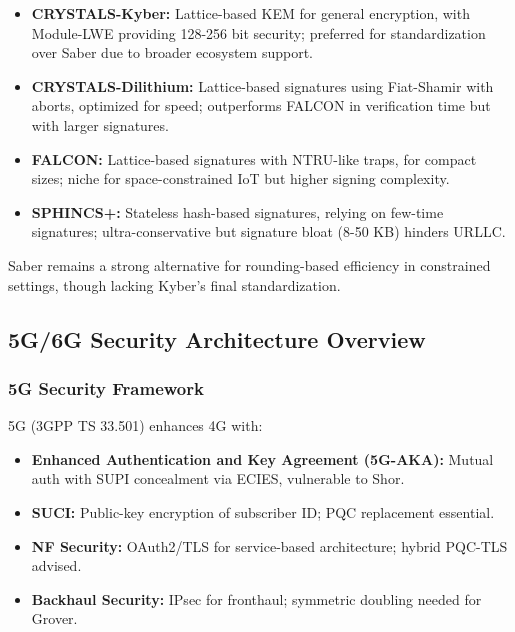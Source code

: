 \documentclass[11pt,a4paper]{article}
\begin{document}
\begin{itemize}
    \item \textbf{CRYSTALS-Kyber:} Lattice-based KEM for general encryption, with Module-LWE providing 128-256 bit security; preferred for standardization over Saber due to broader ecosystem support.
    
    \item \textbf{CRYSTALS-Dilithium:} Lattice-based signatures using Fiat-Shamir with aborts, optimized for speed; outperforms FALCON in verification time but with larger signatures.
    
    \item \textbf{FALCON:} Lattice-based signatures with NTRU-like traps, for compact sizes; niche for space-constrained IoT but higher signing complexity.
    
    \item \textbf{SPHINCS+:} Stateless hash-based signatures, relying on few-time signatures; ultra-conservative but signature bloat (8-50 KB) hinders URLLC.
\end{itemize}

Saber remains a strong alternative for rounding-based efficiency in constrained settings, though lacking Kyber's final standardization.

\subsection{5G/6G Security Architecture Overview}

\subsubsection{5G Security Framework}

5G (3GPP TS 33.501) enhances 4G with:

\begin{itemize}
    \item \textbf{Enhanced Authentication and Key Agreement (5G-AKA):} Mutual auth with SUPI concealment via ECIES, vulnerable to Shor.
    
    \item \textbf{SUCI:} Public-key encryption of subscriber ID; PQC replacement essential.
    
    \item \textbf{NF Security:} OAuth2/TLS for service-based architecture; hybrid PQC-TLS advised.
    
    \item \textbf{Backhaul Security:} IPsec for fronthaul; symmetric doubling needed for Grover.
\end{itemize}
\end{document}
